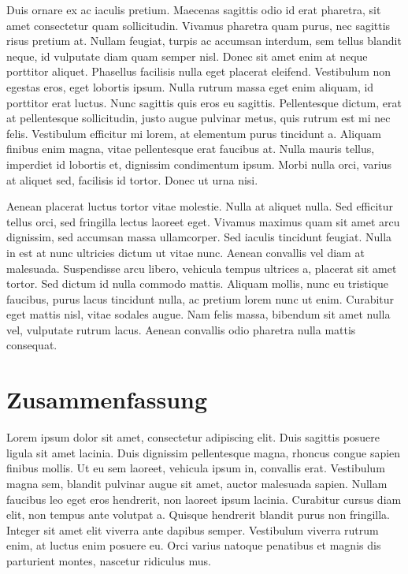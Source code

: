 \documentclass[
  ngerman,
  14pt,
  a4paper,
  DIV=11,
  twoside]{scrreprt}
\begin{document}
Duis ornare ex ac iaculis pretium. Maecenas sagittis odio id erat
pharetra, sit amet consectetur quam sollicitudin. Vivamus pharetra quam
purus, nec sagittis risus pretium at. Nullam feugiat, turpis ac accumsan
interdum, sem tellus blandit neque, id vulputate diam quam semper nisl.
Donec sit amet enim at neque porttitor aliquet. Phasellus facilisis
nulla eget placerat eleifend. Vestibulum non egestas eros, eget lobortis
ipsum. Nulla rutrum massa eget enim aliquam, id porttitor erat luctus.
Nunc sagittis quis eros eu sagittis. Pellentesque dictum, erat at
pellentesque sollicitudin, justo augue pulvinar metus, quis rutrum est
mi nec felis. Vestibulum efficitur mi lorem, at elementum purus
tincidunt a. Aliquam finibus enim magna, vitae pellentesque erat
faucibus at. Nulla mauris tellus, imperdiet id lobortis et, dignissim
condimentum ipsum. Morbi nulla orci, varius at aliquet sed, facilisis id
tortor. Donec ut urna nisi.

Aenean placerat luctus tortor vitae molestie. Nulla at aliquet nulla.
Sed efficitur tellus orci, sed fringilla lectus laoreet eget. Vivamus
maximus quam sit amet arcu dignissim, sed accumsan massa ullamcorper.
Sed iaculis tincidunt feugiat. Nulla in est at nunc ultricies dictum ut
vitae nunc. Aenean convallis vel diam at malesuada. Suspendisse arcu
libero, vehicula tempus ultrices a, placerat sit amet tortor. Sed dictum
id nulla commodo mattis. Aliquam mollis, nunc eu tristique faucibus,
purus lacus tincidunt nulla, ac pretium lorem nunc ut enim. Curabitur
eget mattis nisl, vitae sodales augue. Nam felis massa, bibendum sit
amet nulla vel, vulputate rutrum lacus. Aenean convallis odio pharetra
nulla mattis consequat.


\chapter{Zusammenfassung}\label{zusammenfassung}

Lorem ipsum dolor sit amet, consectetur adipiscing elit. Duis sagittis
posuere ligula sit amet lacinia. Duis dignissim pellentesque magna,
rhoncus congue sapien finibus mollis. Ut eu sem laoreet, vehicula ipsum
in, convallis erat. Vestibulum magna sem, blandit pulvinar augue sit
amet, auctor malesuada sapien. Nullam faucibus leo eget eros hendrerit,
non laoreet ipsum lacinia. Curabitur cursus diam elit, non tempus ante
volutpat a. Quisque hendrerit blandit purus non fringilla. Integer sit
amet elit viverra ante dapibus semper. Vestibulum viverra rutrum enim,
at luctus enim posuere eu. Orci varius natoque penatibus et magnis dis
parturient montes, nascetur ridiculus mus.
\end{document}
